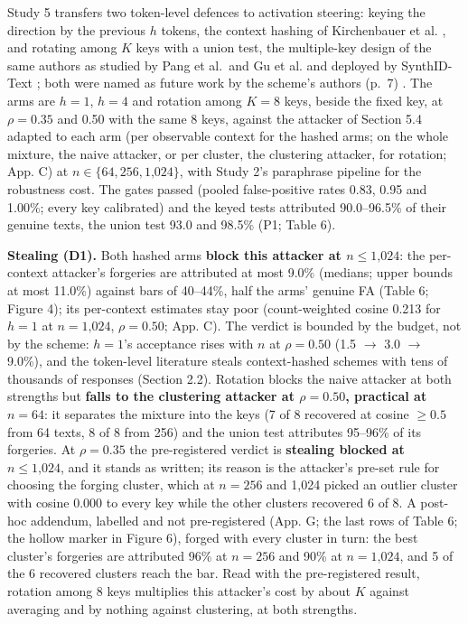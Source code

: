 \documentclass[11pt,letterpaper]{article}
\begin{document}
Study 5 transfers two token-level defences to activation steering: keying the direction by the previous \(h\) tokens, the context hashing of Kirchenbauer et al. \citep{kirchenbauer2023watermark, kirchenbauer2024reliability}, and rotating among \(K\) keys with a union test, the multiple-key design of the same authors \citep{kirchenbauer2023watermark} as studied by Pang et al.~and Gu et al. \citep{pang2024nofreelunch, gu2024learnability} and deployed by SynthID-Text \citep{dathathri2024synthid}; both were named as future work by the scheme's authors (p.~7) \citep{ardoin2026selfrecognition}. The arms are \(h = 1\), \(h = 4\) and rotation among \(K = 8\) keys, beside the fixed key, at \(\rho = 0.35\) and 0.50 with the same 8 keys, against the attacker of Section 5.4 adapted to each arm (per observable context for the hashed arms; on the whole mixture, the naive attacker, or per cluster, the clustering attacker, for rotation; App. C) at \(n \in \{64, 256, \text{1,024}\}\), with Study 2's paraphrase pipeline for the robustness cost. The gates passed (pooled false-positive rates 0.83, 0.95 and 1.00\%; every key calibrated) and the keyed tests attributed 90.0--96.5\% of their genuine texts, the union test 93.0 and 98.5\% (P1; Table 6).

\textbf{Stealing (D1).} Both hashed arms \textbf{block this attacker at \(n \leq \text{1,024}\)}: the per-context attacker's forgeries are attributed at most 9.0\% (medians; upper bounds at most 11.0\%) against bars of 40--44\%, half the arms' genuine FA (Table 6; Figure 4); its per-context estimates stay poor (count-weighted cosine 0.213 for \(h = 1\) at \(n = \text{1,024}\), \(\rho = 0.50\); App. C). The verdict is bounded by the budget, not by the scheme: \(h = 1\)'s acceptance rises with \(n\) at \(\rho = 0.50\) (1.5 \ensuremath{\rightarrow} 3.0 \ensuremath{\rightarrow} 9.0\%), and the token-level literature steals context-hashed schemes with tens of thousands of responses (Section 2.2). Rotation blocks the naive attacker at both strengths but \textbf{falls to the clustering attacker at \(\rho = 0.50\), practical at \(n = 64\)}: it separates the mixture into the keys (7 of 8 recovered at cosine \(\geq 0.5\) from 64 texts, 8 of 8 from 256) and the union test attributes 95--96\% of its forgeries. At \(\rho = 0.35\) the pre-registered verdict is \textbf{stealing blocked at \(n \leq \text{1,024}\)}, and it stands as written; its reason is the attacker's pre-set rule for choosing the forging cluster, which at \(n = 256\) and 1,024 picked an outlier cluster with cosine 0.000 to every key while the other clusters recovered 6 of 8. A post-hoc addendum, labelled and not pre-registered (App. G; the last rows of Table 6; the hollow marker in Figure 6), forged with every cluster in turn: the best cluster's forgeries are attributed 96\% at \(n = 256\) and 90\% at \(n = \text{1,024}\), and 5 of the 6 recovered clusters reach the bar. Read with the pre-registered result, rotation among 8 keys multiplies this attacker's cost by about \(K\) against averaging and by nothing against clustering, at both strengths.
\end{document}
